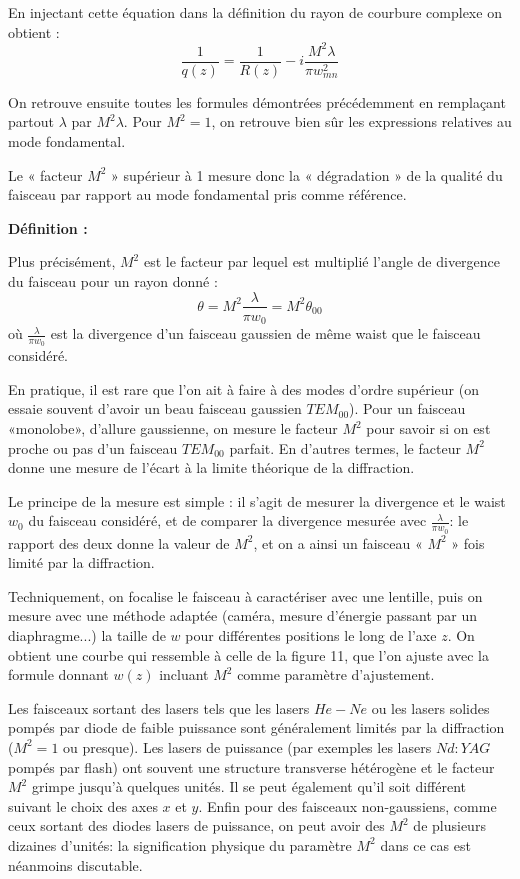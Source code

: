 \documentclass{book}
\begin{document}
En injectant cette équation dans la définition du rayon de courbure complexe on obtient :
\[\frac 1{q(z)}=\frac 1{R(z)}-i\frac{M^2\lambda}{\pi w_{mn}^2}\]

On retrouve ensuite toutes les formules démontrées précédemment en remplaçant partout \(\lambda\) par \(M^2\lambda\). Pour \(M^2=1\), on retrouve bien sûr les expressions relatives au mode fondamental.

Le « facteur \(M^2\) » supérieur à 1 mesure donc la « dégradation » de la qualité du faisceau par rapport au mode fondamental pris comme référence.

\textbf{\color{definition1}Définition :}  
\begin{mdframed}[linecolor=definition1, backgroundcolor=definition2]

Plus précisément, \(M^2\) est le facteur par lequel est multiplié l'angle de divergence du faisceau pour un rayon donné :
\[\theta = M^2\frac\lambda{\pi w_0} = M^2\theta_{00}\]
où \(\frac \lambda{\pi w_0}\) est la divergence d'un faisceau gaussien de même waist que le faisceau considéré.

\end{mdframed}


En pratique, il est rare que l'on ait à faire à des modes d'ordre supérieur (on essaie souvent d'avoir un beau faisceau gaussien \(TEM_{00}\)). Pour un faisceau «monolobe», d'allure gaussienne, on mesure le facteur \(M^2\) pour savoir si on est proche ou pas d'un faisceau \(TEM_{00}\) parfait. En d'autres termes, le facteur \(M^2\) donne une
mesure de l'écart à la limite théorique de la diffraction.

Le principe de la mesure est simple : il s'agit de mesurer la divergence et le waist \(w_0\) du faisceau considéré, et de comparer la divergence mesurée avec \(\frac \lambda{\pi w_0}\): le rapport des deux donne la valeur de \(M^2\), et on a ainsi un faisceau « \(M^2\) » fois limité par la diffraction.

Techniquement, on focalise le faisceau à caractériser avec une lentille, puis on mesure avec une méthode adaptée (caméra, mesure d'énergie passant par un diaphragme...) la taille de \(w\) pour différentes positions le long de l'axe \(z\). On obtient une courbe qui ressemble à celle de la figure 11, que l'on ajuste avec la formule donnant \(w(z)\) incluant \(M^2\) comme paramètre d'ajustement.

Les faisceaux sortant des lasers tels que les lasers \(He-Ne\) ou les lasers solides pompés par diode de faible puissance sont généralement limités par la diffraction (\(M^2=1\) ou presque). Les lasers de puissance (par exemples les lasers \(Nd:YAG\) pompés par flash) ont souvent une structure transverse hétérogène et le facteur \(M^2\) grimpe jusqu'à quelques unités. Il se peut également qu'il soit différent suivant le choix des axes \(x\) et \(y\).
Enfin pour des faisceaux non-gaussiens, comme ceux sortant des diodes lasers de puissance, on peut avoir des \(M^2\) de plusieurs dizaines d'unités: la signification physique du paramètre \(M^2\) dans ce cas est néanmoins discutable.
\end{document}

